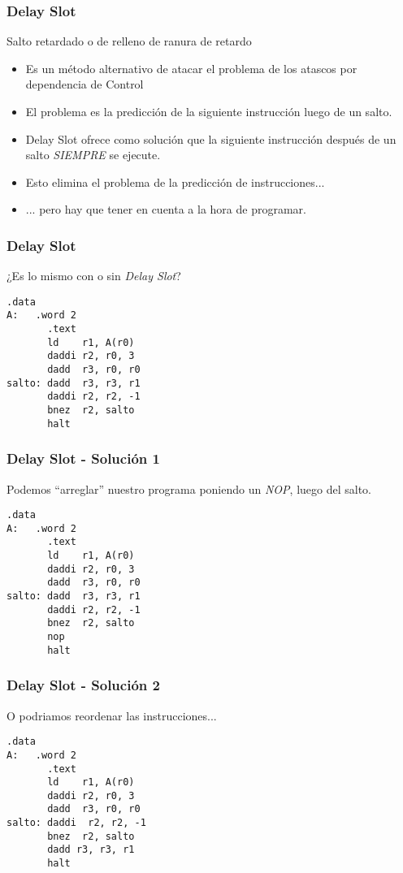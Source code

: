 \documentclass{beamer}
\begin{document}
\begin{frame}
\frametitle{Delay Slot}
Salto retardado o de relleno de ranura de retardo
\begin{itemize}
\item Es un método alternativo de atacar el problema de los atascos por dependencia de Control
\item El problema es la predicción de la siguiente instrucción luego de un salto.
\item Delay Slot ofrece como solución que la siguiente instrucción después de un salto \emph{SIEMPRE} se ejecute.
\item Esto elimina el problema de la predicción de instrucciones...
\item ... pero hay que tener en cuenta a la hora de programar.

\end{itemize}
\end{frame}

\begin{frame}[fragile]
\frametitle{Delay Slot}
¿Es lo mismo con o sin \emph{Delay Slot}?
\begin{block}{}
\begin{lstlisting}[language=WinMIPS64,basicstyle=\ttfamily,keywordstyle=\color{blue}]
       .data
A:   .word 2
       .text
       ld    r1, A(r0)
       daddi r2, r0, 3
       dadd  r3, r0, r0
salto: dadd  r3, r3, r1
       daddi r2, r2, -1
       bnez  r2, salto
       halt
\end{lstlisting}
\end{block}
\end{frame}


\begin{frame}[fragile]
\frametitle{Delay Slot - Solución 1 }
Podemos ``arreglar'' nuestro programa poniendo un \emph{NOP}, luego del salto.
\begin{block}{}
\begin{lstlisting}[language=WinMIPS64,basicstyle=\ttfamily,keywordstyle=\color{blue}]
       .data
A:   .word 2
       .text
       ld    r1, A(r0)
       daddi r2, r0, 3
       dadd  r3, r0, r0
salto: dadd  r3, r3, r1
       daddi r2, r2, -1
       bnez  r2, salto
       nop
       halt
\end{lstlisting}
\end{block}
\end{frame}


\begin{frame}[fragile]
\frametitle{Delay Slot - Solución 2 }
O podriamos reordenar las instrucciones...
\begin{block}{}
\begin{lstlisting}[language=WinMIPS64,basicstyle=\ttfamily,keywordstyle=\color{blue}]
       .data
A:   .word 2
       .text
       ld    r1, A(r0)
       daddi r2, r0, 3
       dadd  r3, r0, r0
salto: daddi  r2, r2, -1
       bnez  r2, salto
       dadd r3, r3, r1
       halt
\end{lstlisting}
\end{block}
\end{frame}
\end{document}
